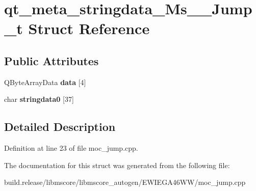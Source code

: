 \hypertarget{structqt__meta__stringdata___ms_____jump__t}{}\section{qt\+\_\+meta\+\_\+stringdata\+\_\+\+Ms\+\_\+\+\_\+\+Jump\+\_\+t Struct Reference}
\label{structqt__meta__stringdata___ms_____jump__t}
\subsection*{Public Attributes}
\begin{DoxyCompactItemize}
\item 
\mbox{\label{structqt__meta__stringdata___ms_____jump__t_a4727353d21ad852467aa95d4f205e899}} 
Q\+Byte\+Array\+Data {\bfseries data} \mbox{[}4\mbox{]}
\item 
\mbox{\label{structqt__meta__stringdata___ms_____jump__t_a2b6a50d379b119ca04020aa4100681d5}} 
char {\bfseries stringdata0} \mbox{[}37\mbox{]}
\end{DoxyCompactItemize}


\subsection{Detailed Description}


Definition at line 23 of file moc\+\_\+jump.\+cpp.



The documentation for this struct was generated from the following file\+:\begin{DoxyCompactItemize}
\item 
build.\+release/libmscore/libmscore\+\_\+autogen/\+E\+W\+I\+E\+G\+A46\+W\+W/moc\+\_\+jump.\+cpp\end{DoxyCompactItemize}
